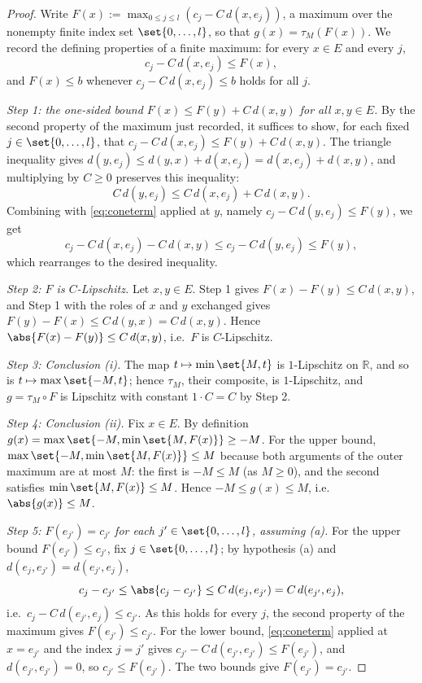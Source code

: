 \begin{proof}
  Write $F(x) := \max_{0 \le j \le l}(c_j - C\,d(x,e_j))$, a maximum over the nonempty finite index
  set $\set{0,\dots,l}$, so that $g(x) = \tau_M(F(x))$. We record the defining properties of a
  finite maximum: for every $x \in E$ and every $j$,
  \begin{equation}\label{eq:coneterm}
    c_j - C\,d(x,e_j) \le F(x)
    ,
  \end{equation}
  and $F(x) \le b$ whenever $c_j - C\,d(x,e_j) \le b$ holds for all $j$.

  \emph{Step 1: the one-sided bound $F(x) \le F(y) + C\,d(x,y)$ for all $x,y \in E$.} By the second
  property of the maximum just recorded, it suffices to show, for each fixed $j \in
  \set{0,\dots,l}$, that $c_j - C\,d(x,e_j) \le F(y) + C\,d(x,y)$. The triangle inequality gives
  $d(y,e_j) \le d(y,x) + d(x,e_j) = d(x,e_j) + d(x,y)$, and multiplying by $C \ge 0$ preserves this
  inequality:
  \[
    C\,d(y,e_j) \le C\,d(x,e_j) + C\,d(x,y)
    .
  \]
  Combining with \eqref{eq:coneterm} applied at $y$, namely $c_j - C\,d(y,e_j) \le F(y)$, we get
  \[
    c_j - C\,d(x,e_j) - C\,d(x,y) \le c_j - C\,d(y,e_j) \le F(y)
    ,
  \]
  which rearranges to the desired inequality.

  \emph{Step 2: $F$ is $C$-Lipschitz.} Let $x,y \in E$. Step 1 gives $F(x) - F(y) \le C\,d(x,y)$,
  and Step 1 with the roles of $x$ and $y$ exchanged gives $F(y) - F(x) \le C\,d(y,x) = C\,d(x,y)$.
  Hence $\abs{F(x)-F(y)} \le C\,d(x,y)$, i.e.\ $F$ is $C$-Lipschitz.

  \emph{Step 3: Conclusion (i).} The map $t \mapsto \min\set{M,t}$ is $1$-Lipschitz on $\mathbb{R}$,
  and so is $t \mapsto \max\set{-M,t}$; hence $\tau_M$, their composite, is $1$-Lipschitz, and
  $g = \tau_M \circ F$ is Lipschitz with constant $1 \cdot C = C$ by Step 2.

  \emph{Step 4: Conclusion (ii).} Fix $x \in E$. By definition $g(x) = \max\set{-M,\min\set{M,F(x)}}
  \ge -M$. For the upper bound, $\max\set{-M, \min\set{M,F(x)}} \le M$ because both arguments of the
  outer maximum are at most $M$: the first is $-M \le M$ (as $M \ge 0$), and the second satisfies
  $\min\set{M,F(x)} \le M$. Hence $-M \le g(x) \le M$, i.e.\ $\abs{g(x)} \le M$.

  \emph{Step 5: $F(e_{j'}) = c_{j'}$ for each $j' \in \set{0,\dots,l}$, assuming (a).} For the upper
  bound $F(e_{j'}) \le c_{j'}$, fix $j \in \set{0,\dots,l}$; by hypothesis (a) and $d(e_j,e_{j'}) =
  d(e_{j'},e_j)$,
  \[
    c_j - c_{j'} \le \abs{c_j - c_{j'}} \le C\,d(e_j,e_{j'}) = C\,d(e_{j'},e_j)
    ,
  \]
  i.e.\ $c_j - C\,d(e_{j'},e_j) \le c_{j'}$. As this holds for every $j$, the second property of the
  maximum gives $F(e_{j'}) \le c_{j'}$. For the lower bound, \eqref{eq:coneterm} applied at $x =
  e_{j'}$ and the index $j = j'$ gives $c_{j'} - C\,d(e_{j'},e_{j'}) \le F(e_{j'})$, and
  $d(e_{j'},e_{j'}) = 0$, so $c_{j'} \le F(e_{j'})$. The two bounds give $F(e_{j'}) = c_{j'}$.


\end{proof}
